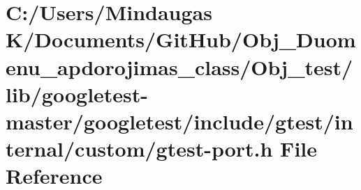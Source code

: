 \hypertarget{_obj__test_2lib_2googletest-master_2googletest_2include_2gtest_2internal_2custom_2gtest-port_8h}{}\section{C\+:/\+Users/\+Mindaugas K/\+Documents/\+Git\+Hub/\+Obj\+\_\+\+Duomenu\+\_\+apdorojimas\+\_\+class/\+Obj\+\_\+test/lib/googletest-\/master/googletest/include/gtest/internal/custom/gtest-\/port.h File Reference}
\label{_obj__test_2lib_2googletest-master_2googletest_2include_2gtest_2internal_2custom_2gtest-port_8h}
